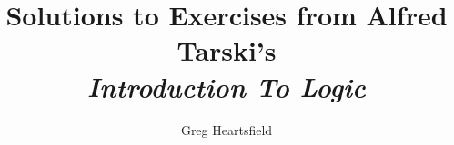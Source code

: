 \documentclass[fleqn]{article}
\begin{document}
\title{Solutions to Exercises from Alfred Tarski's \\ \emph{Introduction To Logic}}
\date{}
\author{Greg Heartsfield}
\maketitle


\end{document}
